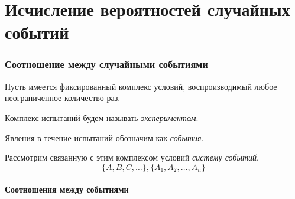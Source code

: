 \part{Исчисление вероятностей случайных событий}
\section{Соотношение между случайными событиями}
Пусть имеется фиксированный комплекс условий, воспроизводимый любое неограниченное количество раз.

\begin{definition}
	Комплекс испытаний будем называть \textit{экспериментом}.
\end{definition}

\begin{definition}
	Явления в течение испытаний обозначим как \textit{события}.
\end{definition}

Рассмотрим связанную с этим комплексом условий \textit{систему событий}.
\[
	\{A, B, C, \dots\},
	\{A_1, A_2, \dots, A_n\}
\]

\subsection{Соотношения между событиями}

